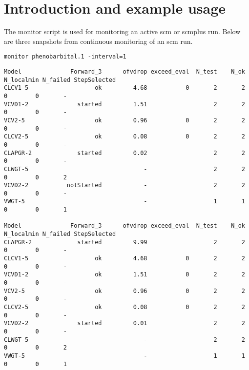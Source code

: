 \documentclass[hideglossary,notoc,hidelof,hidelot,hideTheSignaturePage,hideLinkCurrent,hideloa,pdfLatex,noClient,notitle,hideConfidential]{PMXstyle-20190820}
\begin{document}
\section{Introduction and example usage}
The monitor script is used for monitoring an active scm or scmplus run.
Below are three snapshots from continuous monitoring of an scm run.
\begin{verbatim}
monitor phenobarbital.1 -interval=1
\end{verbatim}
{\tiny
\begin{verbatim}
Model              Forward_3      ofvdrop exceed_eval  N_test    N_ok N_localmin N_failed StepSelected
CLCV1-5                   ok         4.68           0       2       2          0        0       -
VCVD1-2              started         1.51                   2       2          0        0       -
VCV2-5                    ok         0.96           0       2       2          0        0       -
CLCV2-5                   ok         0.08           0       2       2          0        0       -
CLAPGR-2             started         0.02                   2       2          0        0       -
CLWGT-5                                 -                   2       2          0        0       2
VCVD2-2           notStarted            -                   2       2          0        0       -
VWGT-5                                  -                   1       1          0        0       1

Model              Forward_3      ofvdrop exceed_eval  N_test    N_ok N_localmin N_failed StepSelected
CLAPGR-2             started         9.99                   2       2          0        0       -
CLCV1-5                   ok         4.68           0       2       2          0        0       -
VCVD1-2                   ok         1.51           0       2       2          0        0       -
VCV2-5                    ok         0.96           0       2       2          0        0       -
CLCV2-5                   ok         0.08           0       2       2          0        0       -
VCVD2-2              started         0.01                   2       2          0        0       -
CLWGT-5                                 -                   2       2          0        0       2
VWGT-5                                  -                   1       1          0        0       1


\end{verbatim}}
\end{document}
